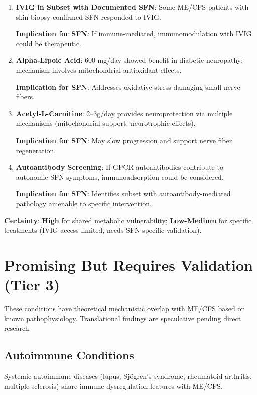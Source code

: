 \begin{enumerate}
    \item \textbf{IVIG in Subset with Documented SFN}: Some ME/CFS patients with skin biopsy-confirmed SFN responded to IVIG.

    \textbf{Implication for SFN}: If immune-mediated, immunomodulation with IVIG could be therapeutic.

    \item \textbf{Alpha-Lipoic Acid}: 600 mg/day showed benefit in diabetic neuropathy; mechanism involves mitochondrial antioxidant effects.

    \textbf{Implication for SFN}: Addresses oxidative stress damaging small nerve fibers.

    \item \textbf{Acetyl-L-Carnitine}: 2--3g/day provides neuroprotection via multiple mechanisms (mitochondrial support, neurotrophic effects).

    \textbf{Implication for SFN}: May slow progression and support nerve fiber regeneration.

    \item \textbf{Autoantibody Screening}: If GPCR autoantibodies contribute to autonomic SFN symptoms, immunoadsorption could be considered.

    \textbf{Implication for SFN}: Identifies subset with autoantibody-mediated pathology amenable to specific intervention.
\end{enumerate}

\textbf{Certainty}: \textbf{High} for shared metabolic vulnerability; \textbf{Low-Medium} for specific treatments (IVIG access limited, needs SFN-specific validation).

\section{Promising But Requires Validation (Tier 3)}
\label{sec:tier3-conditions}

These conditions have theoretical mechanistic overlap with ME/CFS based on known pathophysiology. Translational findings are speculative pending direct research.

\subsection{Autoimmune Conditions}
\label{sec:autoimmune}

Systemic autoimmune diseases (lupus, Sjögren's syndrome, rheumatoid arthritis, multiple sclerosis) share immune dysregulation features with ME/CFS.

